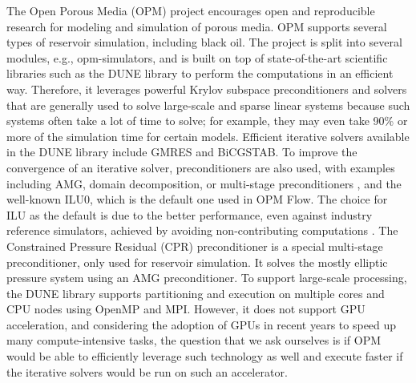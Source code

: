 The Open Porous Media (OPM) \cite{OPM} project encourages open and reproducible research for modeling and simulation of porous media. OPM supports several types of reservoir simulation, including black oil. The project is split into several modules, e.g., opm-simulators, and is built on top of state-of-the-art scientific libraries such as the DUNE \cite{dune} library to perform the computations in an efficient way. Therefore, it leverages powerful Krylov subspace preconditioners and solvers that are generally used to solve large-scale and sparse linear systems because such systems often take a lot of time to solve; for example, they may even take 90\% or more of the simulation time for certain models. Efficient iterative solvers available in the DUNE library include GMRES and BiCGSTAB. To improve the convergence of an iterative solver, preconditioners are also used, with examples including AMG, domain decomposition, or multi-stage preconditioners \cite{saad1,saad2}, and the well-known ILU0, which is the default one used in OPM Flow. The choice for ILU as the default is due to the better performance, even against industry reference simulators, achieved by avoiding non-contributing computations \cite{ILU0-opt}. The Constrained Pressure Residual (CPR) \cite{CPR} preconditioner is a special multi-stage preconditioner, only used for reservoir simulation. It solves the mostly elliptic pressure system using an AMG preconditioner. To support large-scale processing, the DUNE library supports partitioning and execution on multiple cores and CPU nodes using OpenMP and MPI. However, it does not support GPU acceleration, and considering the adoption of GPUs in recent years to speed up many compute-intensive tasks, the question that we ask ourselves is if OPM would be able to efficiently leverage such technology as well and execute faster if the iterative solvers would be run on such an accelerator. 

